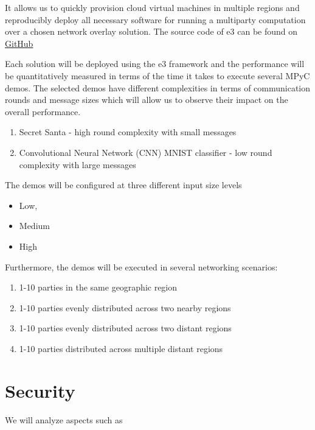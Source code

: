 It allows us to quickly provision cloud virtual machines in multiple regions and reproducibly deploy all necessary software for running a multiparty computation over a chosen network overlay solution. The source code of \gls{e3} can be found on \href{https://github.com/e-nikolov/mpyc}{GitHub}

Each solution will be deployed using the \gls{e3} framework and the performance will be quantitatively measured in terms of the time it takes to execute several MPyC demos. The selected demos have different complexities in terms of communication rounds and message sizes which will allow us to observe their impact on the overall performance.

\begin{enumerate}
\def\labelenumi{\arabic{enumi}.}
\tightlist
\item
  Secret Santa - high round complexity with small messages
\item
  Convolutional Neural Network (CNN) MNIST classifier - low round complexity with large messages
\end{enumerate}

The demos will be configured at three different input size levels

\begin{itemize}
\tightlist
\item
  Low,
\item
  Medium
\item
  High
\end{itemize}

Furthermore, the demos will be executed in several networking scenarios:

\begin{enumerate}
\def\labelenumi{\arabic{enumi}.}
\tightlist
\item
  1-10 parties in the same geographic region
\item
  1-10 parties evenly distributed across two nearby regions
\item
  1-10 parties evenly distributed across two distant regions
\item
  1-10 parties distributed across multiple distant regions
\end{enumerate}

\section{Security}\label{thesis__030-methods.md__security}

We will analyze aspects such as

